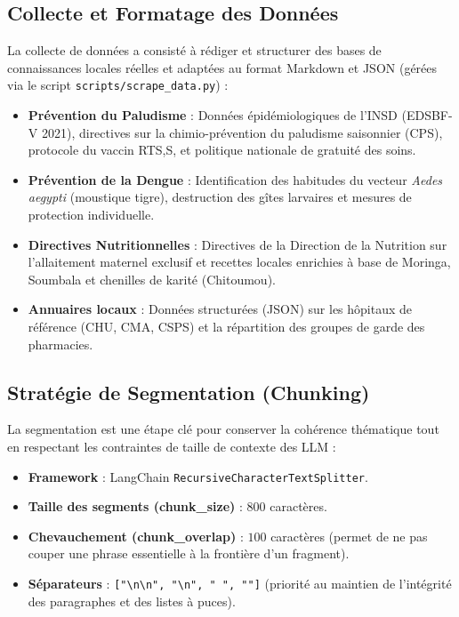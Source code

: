 \documentclass[12pt,a4paper]{article}
\begin{document}
\subsection{Collecte et Formatage des Données}
La collecte de données a consisté à rédiger et structurer des bases de connaissances locales réelles et adaptées au format Markdown et JSON (gérées via le script \texttt{scripts/scrape\_data.py}) :
\begin{itemize}
    \item \textbf{Prévention du Paludisme} : Données épidémiologiques de l'INSD (EDSBF-V 2021), directives sur la chimio-prévention du paludisme saisonnier (CPS), protocole du vaccin RTS,S, et politique nationale de gratuité des soins.
    \item \textbf{Prévention de la Dengue} : Identification des habitudes du vecteur \textit{Aedes aegypti} (moustique tigre), destruction des gîtes larvaires et mesures de protection individuelle.
    \item \textbf{Directives Nutritionnelles} : Directives de la Direction de la Nutrition sur l'allaitement maternel exclusif et recettes locales enrichies à base de Moringa, Soumbala et chenilles de karité (Chitoumou).
    \item \textbf{Annuaires locaux} : Données structurées (JSON) sur les hôpitaux de référence (CHU, CMA, CSPS) et la répartition des groupes de garde des pharmacies.
\end{itemize}

\subsection{Stratégie de Segmentation (Chunking)}
La segmentation est une étape clé pour conserver la cohérence thématique tout en respectant les contraintes de taille de contexte des LLM :
\begin{itemize}
    \item \textbf{Framework} : LangChain \texttt{RecursiveCharacterTextSplitter}.
    \item \textbf{Taille des segments (chunk\_size)} : $800$ caractères.
    \item \textbf{Chevauchement (chunk\_overlap)} : $100$ caractères (permet de ne pas couper une phrase essentielle à la frontière d'un fragment).
    \item \textbf{Séparateurs} : \texttt{["\textbackslash n\textbackslash n", "\textbackslash n", " ", ""]} (priorité au maintien de l'intégrité des paragraphes et des listes à puces).
\end{itemize}
\end{document}
